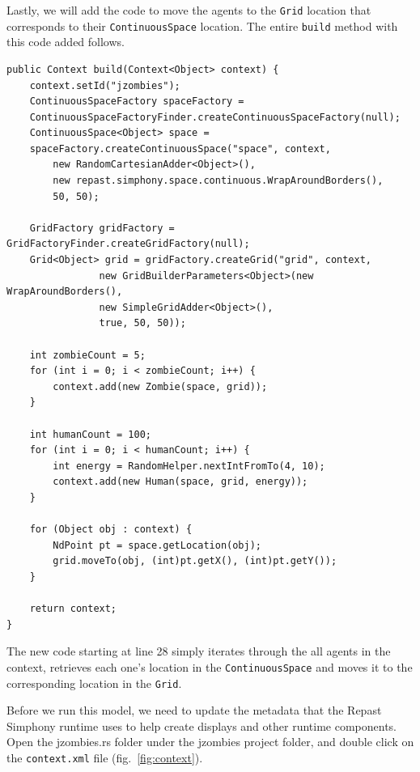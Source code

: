 \documentclass[11pt]{amsart}
\begin{document}
Lastly, we will add the code to move the agents to the \texttt{Grid} location that corresponds to their \texttt{ContinuousSpace} location. The entire \texttt{build} method with this code added follows.

\noindent\begin{minipage}[h]{\textwidth}
\vspace{.2in}
\lstset{language=java,caption=JZombiesBuilder.build Complete }
\begin{lstlisting}
public Context build(Context<Object> context) {
	context.setId("jzombies");
	ContinuousSpaceFactory spaceFactory = 
	ContinuousSpaceFactoryFinder.createContinuousSpaceFactory(null);
	ContinuousSpace<Object> space = 
	spaceFactory.createContinuousSpace("space", context, 
		new RandomCartesianAdder<Object>(),  
		new repast.simphony.space.continuous.WrapAroundBorders(), 
		50, 50);

	GridFactory gridFactory = GridFactoryFinder.createGridFactory(null);
	Grid<Object> grid = gridFactory.createGrid("grid", context,
        		new GridBuilderParameters<Object>(new WrapAroundBorders(), 
        		new SimpleGridAdder<Object>(),
        		true, 50, 50));
	
	int zombieCount = 5;
	for (int i = 0; i < zombieCount; i++) {
		context.add(new Zombie(space, grid));
	}
	
	int humanCount = 100;
	for (int i = 0; i < humanCount; i++) {
		int energy = RandomHelper.nextIntFromTo(4, 10);
		context.add(new Human(space, grid, energy));
	}
	
	for (Object obj : context) {
		NdPoint pt = space.getLocation(obj);
		grid.moveTo(obj, (int)pt.getX(), (int)pt.getY());
	}
	
	return context;
}
\end{lstlisting}
\vspace{.2in}
\end{minipage}

The new code starting at line 28 simply iterates through the all agents in the context, retrieves each one's location in the \texttt{ContinuousSpace} and moves it to the corresponding location in the \texttt{Grid}.

Before we run this model, we need to update the metadata that the Repast Simphony runtime uses to help create displays and other runtime components. Open the jzombies.rs folder under the jzombies project folder, and double click on the \texttt{context.xml} file (fig.~\ref{fig:context}).
\end{document}
